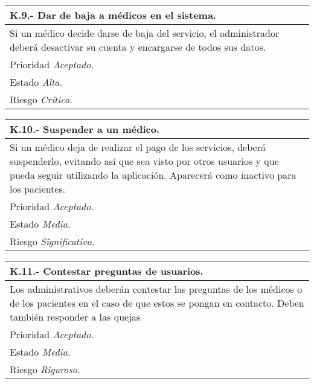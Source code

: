 \documentclass[a4paper,oneside,11pt]{book}
\begin{document}
\begin{center}
\begin{tabulary}{15cm}{|L|}
	\hline
		\bf{K.9.- Dar de baja a médicos en el sistema.} \\
	\hline
		Si un médico decide darse de baja del servicio, el administrador deberá desactivar su cuenta y encargarse de todos sus datos. \\
	\hline
		Prioridad \textit{Aceptado.} \\
	\hline
		Estado \textit{Alta.} \\
	\hline
		Riesgo \textit{Crítico.} \\
	\hline
\end{tabulary}
\end{center}

\begin{center}
\begin{tabulary}{15cm}{|L|}
	\hline
		\bf{K.10.- Suspender a un médico.} \\
	\hline
		Si un médico deja de realizar el pago de los servicios, deberá suspenderlo, evitando así que sea visto por otros usuarios y que pueda seguir utilizando la aplicación. Aparecerá como inactivo para los pacientes. \\
	\hline
		Prioridad \textit{Aceptado.} \\
	\hline
		Estado \textit{Media.} \\
	\hline
		Riesgo \textit{Significativo.} \\
	\hline
\end{tabulary}
\end{center}

\begin{center}
\begin{tabulary}{15cm}{|L|}
	\hline
		\bf{K.11.- Contestar preguntas de usuarios.} \\
	\hline
		Los administrativos deberán contestar las preguntas de los médicos o de los pacientes en el caso de que estos se pongan en contacto. Deben también responder a las quejas\\
	\hline
		Prioridad \textit{Aceptado.} \\
	\hline
		Estado \textit{Media.} \\
	\hline
		Riesgo \textit{Riguroso.} \\
	\hline
\end{tabulary}
\end{center}
\end{document}
